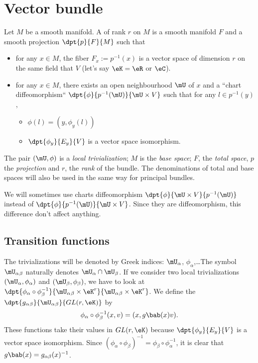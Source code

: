\section{Vector bundle}

Let $M$ be a smooth manifold. A  of rank $r$ on $M$ is a smooth manifold $F$ and a smooth projection $\dpt{p}{F}{M}$ such that

\begin{itemize}
\item for any $x\in M$, the fiber $F_x:=p^{-1}(x)$ is a vector space of dimension $r$ on the same field that $V$ (let's say $\eK=\eR$ or $\eC$).
\item for any $x\in M$, there exists an open neighbourhood $\mU$ of $x$ and a ``chart diffeomorphism``{} $\dpt{\phi}{p^{-1}(\mU)}{\mU\times V}$ such that for any $l\in p^{-1}(y)$,
   \begin{itemize}
      \item $\phi(l)=(y,\phi_y(l))$
      \item $\dpt{\phi_y}{E_y}{V}$ is a vector space isomorphism.
   \end{itemize}
\end{itemize}

The pair $(\mU,\phi)$ is a \emph{local trivialization}; $M$ is the \emph{base space}; $F$, the \emph{total space}, $p$ the \emph{projection} and $r$, the \emph{rank} of the bundle. The denominations of total and base spaces will also be used in the same way for principal bundles.

We will sometimes use charts diffeomorphism $\dpt{\phi}{\mU\times V}{p^{-1}(\mU)}$ instead of $\dpt{\phi}{p^{-1}(\mU)}{\mU\times V}$. Since they are diffeomorphism, this difference don't affect anything.

\subsection{Transition functions}

The trivializations will be denoted by Greek indices: $\mU_{\alpha}$, $\phi_{\alpha}$,\ldots The symbol $\mU_{\alpha}{}_{\beta}$ naturally denotes $\mU_{\alpha}\cap\mU_{\beta}$. If we consider two local trivializations $(\mU_{\alpha},\phi_{\alpha})$ and $(\mU_{\beta},\phi_{\beta})$, we have to look at $\dpt{\phi_{\alpha}\circ\phi_{\beta}^{-1}}{\mU_{\alpha}{}_{\beta}\times\eK^r}{\mU_{\alpha}{}_{\beta}\times\eK^r}$. We define the  $\dpt{g_{\alpha}{}_{\beta}}{\mU_{\alpha}{}_{\beta}}{GL(r,\eK)}$ by
\begin{equation}
\phi_{\alpha}\circ\phi_{\beta}^{-1}(x,v)=(x,g\bab(x)v). 
\end{equation}
These functions take their values in $GL(r,\eK)$ because $\dpt{\phi_y}{E_y}{V}$ is a vector space isomorphism. Since $(\phi_{\alpha}\circ\phi_{\beta})^{-1}=\phi_{\beta}\circ\phi_{\alpha}^{-1}$, it is clear that $g\bab(x)=g_{\alpha\beta}(x)^{-1}$.

